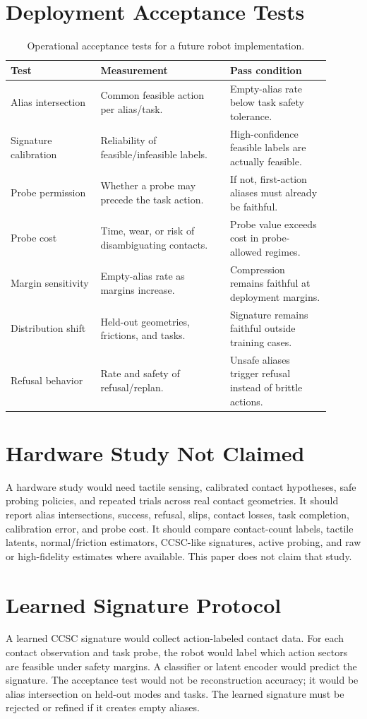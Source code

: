 \documentclass{article}
\begin{document}
\section{Deployment Acceptance Tests}
\begin{table}[p]
\centering
\caption{Operational acceptance tests for a future robot implementation.}
\label{tab:acceptance-tests}
\small
\begin{tabular}{p{0.25\linewidth}p{0.36\linewidth}p{0.29\linewidth}}
\toprule
Test & Measurement & Pass condition\\
\midrule
Alias intersection & Common feasible action per alias/task. & Empty-alias rate below task safety tolerance.\\
Signature calibration & Reliability of feasible/infeasible labels. & High-confidence feasible labels are actually feasible.\\
Probe permission & Whether a probe may precede the task action. & If not, first-action aliases must already be faithful.\\
Probe cost & Time, wear, or risk of disambiguating contacts. & Probe value exceeds cost in probe-allowed regimes.\\
Margin sensitivity & Empty-alias rate as margins increase. & Compression remains faithful at deployment margins.\\
Distribution shift & Held-out geometries, frictions, and tasks. & Signature remains faithful outside training cases.\\
Refusal behavior & Rate and safety of refusal/replan. & Unsafe aliases trigger refusal instead of brittle actions.\\
\bottomrule
\end{tabular}
\end{table}

\section{Hardware Study Not Claimed}
A hardware study would need tactile sensing, calibrated contact hypotheses, safe probing policies, and repeated trials across real contact geometries. It should report alias intersections, success, refusal, slips, contact losses, task completion, calibration error, and probe cost. It should compare contact-count labels, tactile latents, normal/friction estimators, CCSC-like signatures, active probing, and raw or high-fidelity estimates where available. This paper does not claim that study.

\section{Learned Signature Protocol}
A learned CCSC signature would collect action-labeled contact data. For each contact observation and task probe, the robot would label which action sectors are feasible under safety margins. A classifier or latent encoder would predict the signature. The acceptance test would not be reconstruction accuracy; it would be alias intersection on held-out modes and tasks. The learned signature must be rejected or refined if it creates empty aliases.
\end{document}
